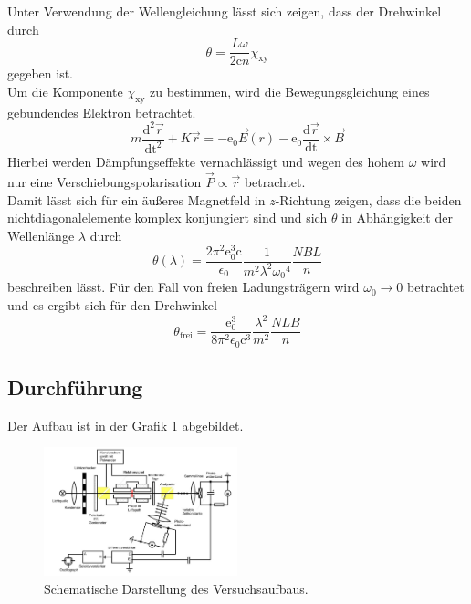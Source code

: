  Unter Verwendung der Wellengleichung lässt sich zeigen, dass der Drehwinkel durch
  \begin{equation}
    \theta=\frac{L\omega}{2\text{c}n}\chi_{\text{xy}}
  \end{equation}
  gegeben ist.\\
  Um die Komponente $\chi_{\text{xy}}$ zu bestimmen, wird die Bewegungsgleichung
  eines gebundendes Elektron betrachtet.
  \begin{equation}
    m\frac{\text{d}^2 \vec{r}}{\text{dt}^2}+K\vec{r}= -\text{e}_0
    \vec{E}(r)-\text{e}_0\frac{\text{d}\vec{r}}{\text{dt}}\times \vec{B}
    \end{equation}
  Hierbei werden Dämpfungseffekte vernachlässigt und wegen des hohem $\omega$ wird nur eine
  Verschiebungspolarisation $\vec{P} \propto \vec{r}$ betrachtet.\\
  Damit lässt sich für ein äußeres Magnetfeld in $z$-Richtung zeigen, dass
  die beiden nichtdiagonalelemente komplex konjungiert sind und sich $\theta$ in Abhängigkeit der
  Wellenlänge $\lambda$ durch
  \begin{equation}
    \theta(\lambda)=\frac{2\pi^2 \text{e}_0^3 \text{c}}{\epsilon_0}\frac{1}{m^2 \lambda^2 \omega{_0}^4}\frac{N B L}{n}
    \label{eq:WinkelLambda}
  \end{equation}
      beschreiben lässt.
  Für den Fall von freien Ladungsträgern wird $\omega_0 \rightarrow 0$ betrachtet und es ergibt sich für den Drehwinkel
\begin{equation}
  \theta_{\text{frei}}=\frac{\text{e}_0^3}{8 \pi^2 \epsilon_0 \text{c}^3}\frac{\lambda^2}{m^2}\frac{N L B}{n}
  \label{eq:Winkelfrei}
\end{equation}
\subsection{Durchführung}
Der Aufbau ist in der Grafik \ref{fig:Aufbau} abgebildet.
\begin{figure}[H]
\center
\includegraphics[width=0.5\textwidth]{pics/Aufbau.jpg}
\caption{Schematische Darstellung des Versuchsaufbaus.\cite{Anleitung}}  %
\label{fig:Aufbau}
\end{figure}
